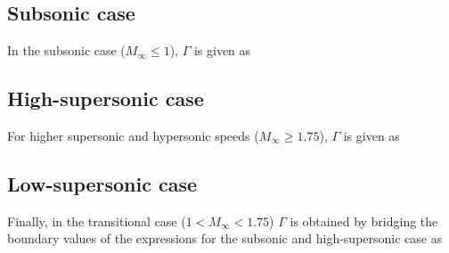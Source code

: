     \subsection{Subsonic case}
        In the subsonic case ($M_\infty \leq 1$), $\Gamma$ is given as

    \subsection{High-supersonic case} \label{DH-h}
        For higher supersonic and hypersonic speeds ($M_\infty \geq \num{1.75}$), $\Gamma$ is given as

    \subsection{Low-supersonic case} \label{DH-l}
        Finally, in the transitional case ($1 < M_\infty < \num{1.75}$) $\Gamma$ is obtained
        by bridging the boundary values of the expressions for the subsonic and high-supersonic case as


